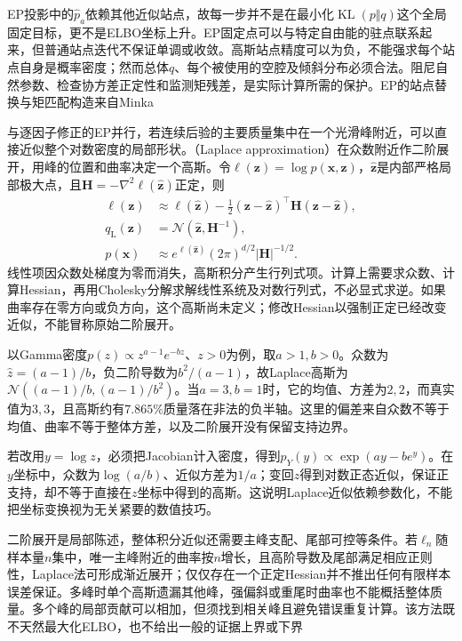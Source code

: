 EP投影中的$\widehat p_a$依赖其他近似站点，故每一步并不是在最小化$\operatorname{KL}(p\Vert q)$这个全局固定目标，更不是ELBO坐标上升。EP固定点可以与特定自由能的驻点联系起来，但普通站点迭代不保证单调或收敛。高斯站点精度可以为负，不能强求每个站点自身是概率密度；然而总体$q$、每个被使用的空腔及倾斜分布必须合法。阻尼自然参数、检查协方差正定性和监测矩残差，是实际计算所需的保护。EP的站点替换与矩匹配构造来自Minka

\label{sec:pgm-variational-laplace}

与逐因子修正的EP并行，若连续后验的主要质量集中在一个光滑峰附近，可以直接近似整个对数密度的局部形状。（Laplace approximation）在众数附近作二阶展开，用峰的位置和曲率决定一个高斯。令$\ell(\bm z)=\log p(\bm x,\bm z)$，$\widehat{\bm z}$是内部严格局部极大点，且$\bm H=-\nabla^2\ell(\widehat{\bm z})$正定，则
\begin{equation}
  \begin{aligned}
    \ell(\bm z)&\approx\ell(\widehat{\bm z})
       -\frac12(\bm z-\widehat{\bm z})^\top
                  \bm H(\bm z-\widehat{\bm z}),\\
    q_{\mathrm L}(\bm z)&=\mathcal N(\widehat{\bm z},\bm H^{-1}),\\
    p(\bm x)&\approx
       e^{\ell(\widehat{\bm z})}(2\pi)^{d/2}|\bm H|^{-1/2}.
  \end{aligned}
  \label{eq:pgm-variational-laplace}
\end{equation}
线性项因众数处梯度为零而消失，高斯积分产生行列式项。计算上需要求众数、计算Hessian，再用Cholesky分解求解线性系统及对数行列式，不必显式求逆。如果曲率存在零方向或负方向，这个高斯尚未定义；修改Hessian以强制正定已经改变近似，不能冒称原始二阶展开。

以Gamma密度$p(z)\propto z^{a-1}e^{-bz}$、$z>0$为例，取$a>1,b>0$。众数为$\widehat z=(a-1)/b$，负二阶导数为$b^2/(a-1)$，故Laplace高斯为$\mathcal N((a-1)/b,(a-1)/b^2)$。当$a=3,b=1$时，它的均值、方差为$2,2$，而真实值为$3,3$，且高斯约有$7.865\%$质量落在非法的负半轴。这里的偏差来自众数不等于均值、曲率不等于整体方差，以及二阶展开没有保留支持边界。

若改用$y=\log z$，必须把Jacobian计入密度，得到$p_Y(y)\propto\exp(ay-be^y)$。在$y$坐标中，众数为$\log(a/b)$、近似方差为$1/a$；变回$z$得到对数正态近似，保证正支持，却不等于直接在$z$坐标中得到的高斯。这说明Laplace近似依赖参数化，不能把坐标变换视为无关紧要的数值技巧。

二阶展开是局部陈述，整体积分近似还需要主峰支配、尾部可控等条件。若$\ell_n$随样本量$n$集中，唯一主峰附近的曲率按$n$增长，且高阶导数及尾部满足相应正则性，Laplace法可形成渐近展开；仅仅存在一个正定Hessian并不推出任何有限样本误差保证。多峰时单个高斯遗漏其他峰，强偏斜或重尾时曲率也不能概括整体质量。多个峰的局部贡献可以相加，但须找到相关峰且避免错误重复计算。该方法既不天然最大化ELBO，也不给出一般的证据上界或下界

